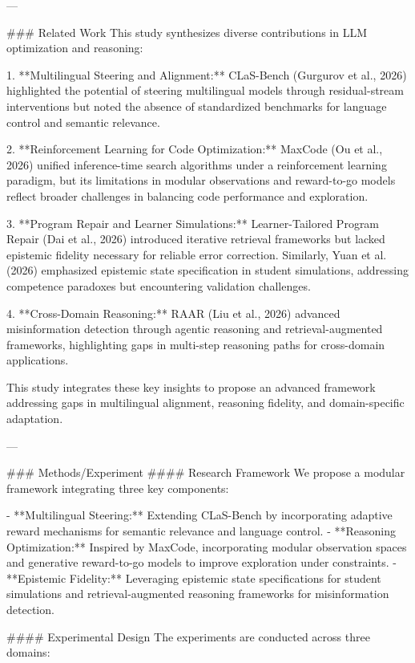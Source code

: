 ---

### Related Work  
This study synthesizes diverse contributions in LLM optimization and reasoning:  

1. **Multilingual Steering and Alignment:**  
CLaS-Bench (Gurgurov et al., 2026) highlighted the potential of steering multilingual models through residual-stream interventions but noted the absence of standardized benchmarks for language control and semantic relevance.  

2. **Reinforcement Learning for Code Optimization:**  
MaxCode (Ou et al., 2026) unified inference-time search algorithms under a reinforcement learning paradigm, but its limitations in modular observations and reward-to-go models reflect broader challenges in balancing code performance and exploration.  

3. **Program Repair and Learner Simulations:**  
Learner-Tailored Program Repair (Dai et al., 2026) introduced iterative retrieval frameworks but lacked epistemic fidelity necessary for reliable error correction. Similarly, Yuan et al. (2026) emphasized epistemic state specification in student simulations, addressing competence paradoxes but encountering validation challenges.  

4. **Cross-Domain Reasoning:**  
RAAR (Liu et al., 2026) advanced misinformation detection through agentic reasoning and retrieval-augmented frameworks, highlighting gaps in multi-step reasoning paths for cross-domain applications.  

This study integrates these key insights to propose an advanced framework addressing gaps in multilingual alignment, reasoning fidelity, and domain-specific adaptation.

---

### Methods/Experiment  
#### Research Framework  
We propose a modular framework integrating three key components:  

- **Multilingual Steering:** Extending CLaS-Bench by incorporating adaptive reward mechanisms for semantic relevance and language control.  
- **Reasoning Optimization:** Inspired by MaxCode, incorporating modular observation spaces and generative reward-to-go models to improve exploration under constraints.  
- **Epistemic Fidelity:** Leveraging epistemic state specifications for student simulations and retrieval-augmented reasoning frameworks for misinformation detection.  

#### Experimental Design  
The experiments are conducted across three domains:  

